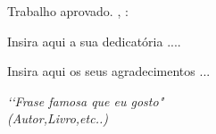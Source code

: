 
\begin{folhadeaprovacao}
\begin{center}
{\ABNTEXchapterfont\large\imprimirautor}
\vspace*{\fill}\vspace*{\fill}
\begin{center}
\ABNTEXchapterfont\bfseries\Large\imprimirtitulo
\end{center}
\vspace*{\fill}
\hspace{.45\textwidth}
\begin{minipage}{.5\textwidth}
\imprimirpreambulo
\end{minipage}%
\vspace*{\fill}
\end{center}
Trabalho aprovado. \imprimirlocal, \imprimirdata:
\begin{center}
\vspace*{0.5cm}
{\large\imprimirlocal}
\par
{\large\imprimirdata}
\vspace*{1cm}
\end{center}
\end{folhadeaprovacao}


\begin{dedicatoria}
	\vspace*{\fill}
    \hspace*{\fill}
    		Insira aqui a sua dedicatória ....
    \hspace*{\fill}
	\vspace*{\fill}
\end{dedicatoria}

\begin{agradecimentos}
	Insira aqui os seus agradecimentos ...
\end{agradecimentos}


\begin{epigrafe}
	\vspace*{\fill}
		\begin{flushright}
			\textit{‘‘Frase famosa que eu gosto"\\
            (Autor,Livro,etc..)}
		\end{flushright}
\end{epigrafe}

